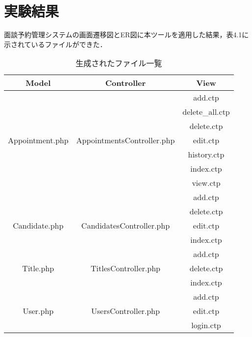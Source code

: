 \documentclass{funthesis}
\begin{document}
\section{実験結果}
面談予約管理システムの画面遷移図とER図に本ツールを適用した結果，表4.1に示されているファイルができた．
\begin{table}[h]
  \begin{center}
    \caption{生成されたファイル一覧}
    \begin{tabular}{|c|c|c|} \hline
      Model & Controller & View \\ \hline \hline
       & & add.ctp \\
       & & delete\_all.ctp \\
       & & delete.ctp\\
       Appointment.php & AppointmentsController.php & edit.ctp \\
       & & history.ctp \\
       & & index.ctp \\
       & & view.ctp \\ \hline
       & & add.ctp \\
       & & delete.ctp\\
       Candidate.php & CandidatesController.php & edit.ctp \\
       & & index.ctp \\ \hline
       & & add.ctp \\
       Title.php & TitlesController.php & delete.ctp \\
       & & index.ctp \\ \hline
       & & add.ctp \\
       User.php & UsersController.php & edit.ctp \\
       & & login.ctp \\ \hline
    \end{tabular}
  \end{center}
\end{table}\\
\end{document}
